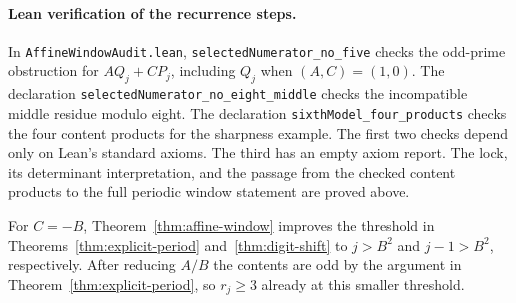 \documentclass[11pt]{amsart}
\theoremstyle{definition}
\theoremstyle{remark}
\numberwithin{equation}{section}
\begin{document}
\paragraph{Lean verification of the recurrence steps.}
In \texttt{AffineWindowAudit.lean}, \texttt{selectedNumerator\_no\_five}
checks the odd-prime obstruction for $AQ_j+CP_j$, including $Q_j$ when
$(A,C)=(1,0)$. The declaration \texttt{selectedNumerator\_no\_eight\_middle}
checks the incompatible middle residue modulo eight.
The declaration \texttt{sixthModel\_four\_products} checks the four
content products for the sharpness example. The first two checks depend
only on Lean's standard axioms. The third has an empty axiom report.
The lock, its determinant interpretation, and the passage from the
checked content products to the full periodic window statement are
proved above.

For $C=-B$, Theorem~\ref{thm:affine-window} improves the
threshold in Theorems~\ref{thm:explicit-period} and~\ref{thm:digit-shift}
to $j>B^2$ and $j-1>B^2$, respectively. After reducing $A/B$
the contents are odd by the argument in Theorem~\ref{thm:explicit-period},
so $r_j\ge3$ already at this smaller threshold.
\end{document}
